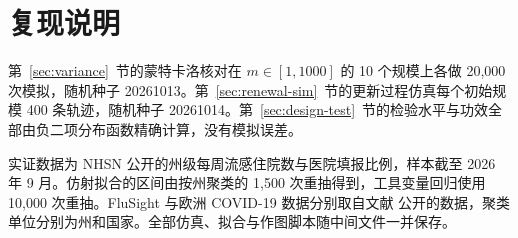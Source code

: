 \section{复现说明}
\label{app:repro}

第~\ref{sec:variance}~节的蒙特卡洛核对在 $m\in[1,1000]$ 的 10 个规模上各做 20,000 次模拟，随机种子 20261013。第~\ref{sec:renewal-sim}~节的更新过程仿真每个初始规模 400 条轨迹，随机种子 20261014。第~\ref{sec:design-test}~节的检验水平与功效全部由负二项分布函数精确计算，没有模拟误差。

实证数据为 NHSN 公开的州级每周流感住院数与医院填报比例\citep{cdc2026nhsn}，样本截至 2026 年 9 月。仿射拟合的区间由按州聚类的 1,500 次重抽得到，工具变量回归使用 10,000 次重抽。FluSight 与欧洲 COVID-19 数据分别取自文献\citep{mathis2024evaluation, flaxman2020estimating} 公开的数据，聚类单位分别为州和国家。全部仿真、拟合与作图脚本随中间文件一并保存。
